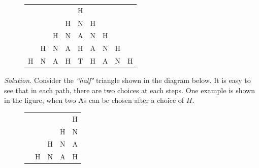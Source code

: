 \begin{multicols}{2}
\begin{figure}[H]
		\centering
		\captionsetup{labelformat= empty, justification=centering}
		\renewcommand{\arraystretch}{1.2}
		\begin{tabular}{ccccccccc}
		&   &   &   & H                                                &                                                  &                                                  &   &   \\
		&   &   & H & N                                                & H                                                &                                                  &   &   \\
		&   & H & N & A                                                & \cellcolor{cackithi!40}N & \cellcolor{cackithi!40}H &   &   \\
		& H & N & A & \cellcolor{cackithi!40}H& \cellcolor{cackithi!40}  A  & N                                                & H &   \\
		H & N & A & H & \cellcolor{cackithi!40}T & H                                                & A                                                & N &  H 
	\end{tabular} 
	\vspace*{-10pt}
	\end{figure}
	\textit{Solution.}
	Consider the \textit{``half"} triangle shown in the diagram below.
	It is easy to see that in each path, there are two choices at each steps.
	One example is shown in the figure, when two As can be chosen after a choice of $H$.
	\begin{figure}[H]
	\vspace*{-5pt}
	\centering
	\captionsetup{labelformat= empty, justification=centering}
	\renewcommand{\arraystretch}{1.2}
	\begin{tabular}{ccccl}
		&   &                                                  &                                                  &  H                                                 \\
		&   &                                                  &  H                                                 &  N                                                 \\
		&   &  H                                                 &  N                                                 &  A                                                 \\
		&  H  &  N                                                 & \cellcolor{toancuabi!40}  A &  H                                                 \\

\end{tabular}
\end{figure}
\end{multicols}
